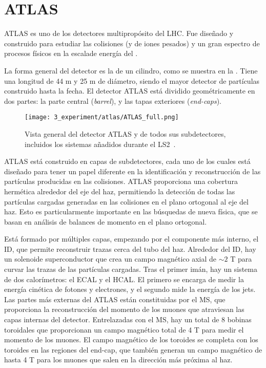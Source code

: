 \FloatBarrier
\section{ATLAS}
\label{sec:atlas:atlas}

\ac{ATLAS} es uno de los detectores multipropósito del \ac{LHC}. Fue diseñado y construido para estudiar las colisiones \pp (y de iones pesados) y un gran espectro de procesos f\'isicos en la escalade energ\'ia del \tev.

La forma general del detector es la de un cilindro, como se muestra en la \Fig{\ref{fig:atlas:atlas:atlas}}. Tiene una longitud de 44 m y 25 m de diámetro, siendo el mayor detector de partículas construido hasta la fecha. El detector \ac{ATLAS} está dividido geométricamente en dos partes: la parte central (\textit{barrel}), y las tapas exteriores (\textit{end-caps}).

\begin{figure}[ht!]
    \centering
    \texttt{[image: 3\_experiment/atlas/ATLAS\_full.png]}
    \caption{Vista general del detector \ac{ATLAS} y de todos sus subdetectores, incluidos los sistemas añadidos durante el \ac{LS2}~\cite{ATLAS-Diagram}.}
    \label{fig:atlas:atlas:atlas}
\end{figure}

\ac{ATLAS} está construido en capas de subdetectores, cada uno de los cuales está diseñado para tener un papel diferente en la identificación y reconstrucción de las partículas producidas en las colisiones. \ac{ATLAS} proporciona una cobertura hermética alrededor del eje del haz, permitiendo la detección de todas las partículas cargadas generadas en las colisiones en el plano ortogonal al eje del haz. Esto es particularmente importante en las búsquedas de nueva física, que se basan en análisis de balances de momento en el plano ortogonal.

Está formado por múltiples capas, empezando por el componente más interno, el \acf{ID}, que permite reconstruir trazas cerca del tubo del haz. Alrededor del \ac{ID}, hay un solenoide superconductor que crea un campo magnético axial de \(\sim 2\) T para curvar las trazas de las partículas cargadas.
Tras el primer imán, hay un sistema de dos calorímetros: el \acf{ECAL} y el \acf{HCAL}. El primero se encarga de medir la energía cinética de fotones y electrones, y el segundo mide la energía de los jets.
Las partes más externas del \ac{ATLAS} están constituidas por el \acf{MS}, que proporciona la reconstrucción del momento de los muones que atraviesan las capas internas del detector. Entrelazadas con el \ac{MS}, hay un total de 8 bobinas toroidales que proporcionan un campo magnético total de 4 T para medir el momento de los muones. El campo magnético de los toroides se completa con los toroides en las regiones del end-cap, que también generan un campo magnético de hasta 4 T para los muones que salen en la direcci\'on m\'as pr\'oxima al haz.

